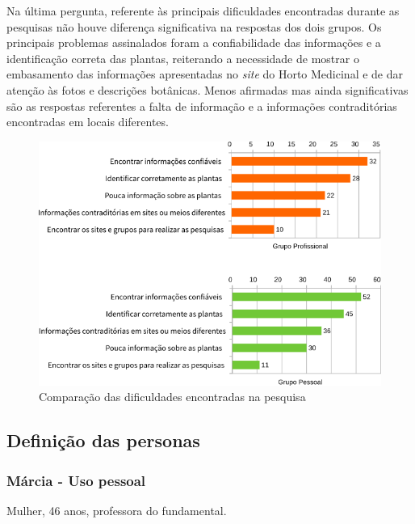 Na última pergunta, referente às principais dificuldades encontradas durante as pesquisas não houve diferença significativa na respostas dos dois grupos. Os principais problemas assinalados foram a confiabilidade das informações e a identificação correta das plantas, reiterando a necessidade de mostrar o embasamento das informações apresentadas no \emph{site} do Horto Medicinal e de dar atenção às fotos e descrições botânicas. Menos afirmadas mas ainda significativas são as respostas referentes a falta de informação e a informações contraditórias encontradas em locais diferentes.

\begin{figure}[!htbp]
\centering
\caption{\label{graf-prob}Comparação das dificuldades encontradas na pesquisa}
\includegraphics[width=\textwidth]{images/prob.png}
\end{figure}


\subsection{Definição das personas}\label{definicao-das-personas}

\subsubsection{Márcia - Uso pessoal}

Mulher, 46 anos, professora do fundamental.

